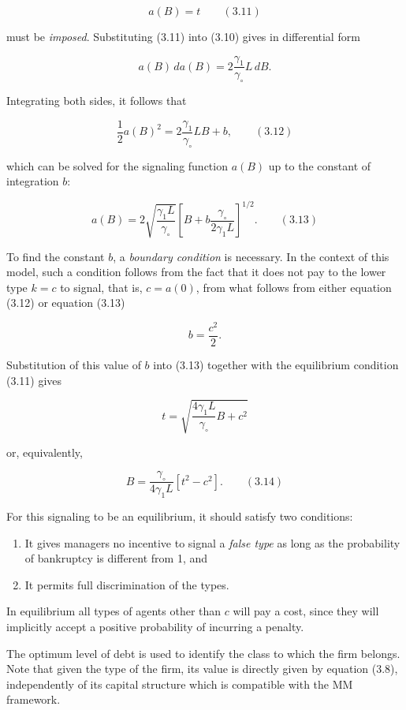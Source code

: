 \documentclass[11pt,a4paper]{article}
\providecommand{\tightlist}{\setlength{\itemsep}{0pt}\setlength{\parskip}{0pt}}
\begin{document}
\[a(B) = t \qquad (3.11)\]

must be \emph{imposed}. Substituting (3.11) into (3.10) gives in differential form

\[a(B)\,da(B) = 2\frac{\gamma_1}{\gamma_\circ}L\,dB.\]

Integrating both sides, it follows that

\[\frac{1}{2}a(B)^2 = 2\frac{\gamma_1}{\gamma_\circ}LB + b, \qquad (3.12)\]

which can be solved for the signaling function \(a(B)\) up to the constant of integration \(b\):

\[a(B) = 2\sqrt{\frac{\gamma_1 L}{\gamma_\circ}}\left[B + b\frac{\gamma_\circ}{2\gamma_1 L}\right]^{1/2}. \qquad (3.13)\]

To find the constant \(b\), a \emph{boundary condition} is necessary. In the context of this model,
such a condition follows from the fact that it does not pay to the lower type \(k = c\) to signal,
that is, \(c = a(0)\), from what follows from either equation (3.12) or equation (3.13)

\[b = \frac{c^2}{2}.\]

Substitution of this value of \(b\) into (3.13) together with the equilibrium condition (3.11) gives

\[t = \sqrt{\frac{4\gamma_1 L}{\gamma_\circ}B + c^2}\]

or, equivalently,

\[B = \frac{\gamma_\circ}{4\gamma_1 L}\left[t^2 - c^2\right]. \qquad (3.14)\]

For this signaling to be an equilibrium, it should satisfy two conditions:

\begin{enumerate}
\def\labelenumi{\arabic{enumi}.}
\tightlist
\item
  It gives managers no incentive to signal a \emph{false type} as long as the probability of
  bankruptcy is different from 1, and
\item
  It permits full discrimination of the types.
\end{enumerate}

In equilibrium all types of agents other than \(c\) will pay a cost, since they will implicitly
accept a positive probability of incurring a penalty.

The optimum level of debt is used to identify the class to which the firm belongs. Note that given
the type of the firm, its value is directly given by equation (3.8), independently of its capital
structure which is compatible with the MM framework.
\end{document}
